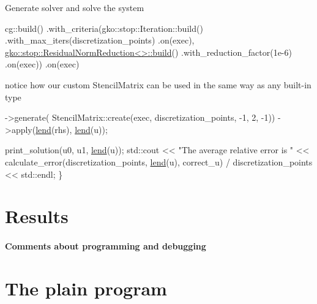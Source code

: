 Generate solver and solve the system


\begin{DoxyCode}
cg::build()
    .with\_criteria(gko::stop::Iteration::build()
                       .with\_max\_iters(discretization\_points)
                       .on(exec),
                   \hyperlink{classgko_1_1stop_1_1ResidualNormReduction}{gko::stop::ResidualNormReduction<>::build}()
                       .with\_reduction\_factor(1e-6)
                       .on(exec))
    .on(exec)
\end{DoxyCode}


notice how our custom Stencil\+Matrix can be used in the same way as any built-\/in type


\begin{DoxyCode}
        ->generate(
            StencilMatrix::create(exec, discretization\_points, -1, 2, -1))
        ->apply(\hyperlink{namespacegko_aa8cb4876b72e5e1036ea9575443c439b}{lend}(rhs), \hyperlink{namespacegko_aa8cb4876b72e5e1036ea9575443c439b}{lend}(u));

    print\_solution(u0, u1, \hyperlink{namespacegko_aa8cb4876b72e5e1036ea9575443c439b}{lend}(u));
    std::cout << \textcolor{stringliteral}{"The average relative error is "}
              << calculate\_error(discretization\_points, \hyperlink{namespacegko_aa8cb4876b72e5e1036ea9575443c439b}{lend}(u), correct\_u) /
                     discretization\_points
              << std::endl;
\}
\end{DoxyCode}
 \label{_Results}%
\section*{Results}

\label{_Commentsaboutprogramminganddebugging}%
\paragraph*{Comments about programming and debugging }

\label{_PlainProg}%
 \section*{The plain program}


\begin{DoxyCodeInclude}
\end{DoxyCodeInclude}
 